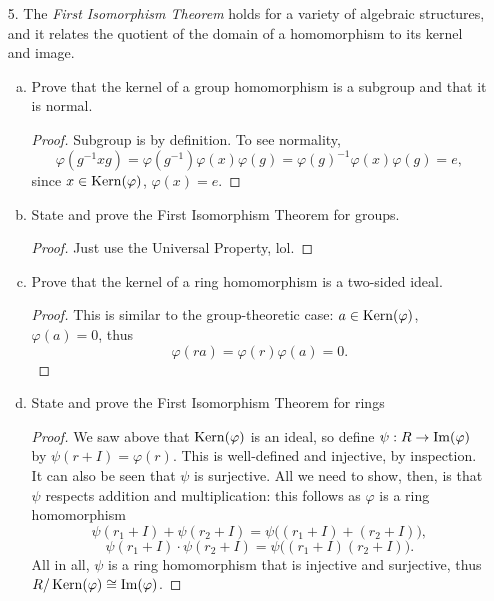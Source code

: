 \begin{itemize}
\begin{enumerate}[(a)]
\begin{proof}
    Any $g \in G$ must generate the whole group, so suppose $g$ has order $kl$. The subgroup generated by $g^k$ will be a non-trivial normal subgroup, so $|G|$ must be just $p$. So $G$ is cyclic of prime order, thus isomorphic to $\bbz_p$.
    \end{proof}
\end{enumerate}








\item[5.] The \textit{First Isomorphism Theorem} holds for a variety of algebraic structures, and it relates the quotient of the domain of a homomorphism to its kernel and image.
\begin{enumerate}[(a)]
    \item Prove that the kernel of a group homomorphism is a subgroup and that it is normal.
    \begin{proof}
    Subgroup is by definition. To see normality, $$\varphi(g^{-1}xg) = \varphi(g^{-1}) \varphi(x) \varphi(g) = \varphi(g)^{-1} \varphi(x) \varphi(g) = e,$$
    since $x \in \operatorname{Kern}(\varphi)$, $\varphi(x) = e$.
    \end{proof}
    
    \item State and prove the First Isomorphism Theorem for groups.
    \begin{proof}
    Just use the Universal Property, lol.
    \end{proof}
    
    \item Prove that the kernel of a ring homomorphism is a two-sided ideal.
    \begin{proof}
    This is similar to the group-theoretic case: $a \in \operatorname{Kern}(\varphi)$, $\varphi(a) = 0$, thus 
    $$\varphi(ra) = \varphi(r)\varphi(a) = 0.$$
    \end{proof}
    
    \item State and prove the First Isomorphism Theorem for rings
    \begin{proof}
    We saw above that $\operatorname{Kern}(\varphi)$ is an ideal, so define $\psi: R \rightarrow \operatorname{Im}(\varphi)$ by $\psi(r+I) = \varphi(r)$. This is well-defined and injective, by inspection. It can also be seen that $\psi$ is surjective. All we need to show, then, is that $\psi$ respects addition and multiplication: this follows as $\varphi$ is a ring homomorphism
    $$\psi(r_1+I) + \psi(r_2+I) =\psi\Big((r_1+I) + (r_2+I)\Big),$$
    $$\psi(r_1+I) \cdot \psi(r_2+I) =\psi\Big((r_1+I)(r_2+I)\Big).$$
    All in all, $\psi$ is a ring homomorphism that is injective and surjective, thus $R/\operatorname{Kern}(\varphi) \cong \operatorname{Im}(\varphi)$.
    \end{proof}
\end{enumerate}












\end{itemize}
